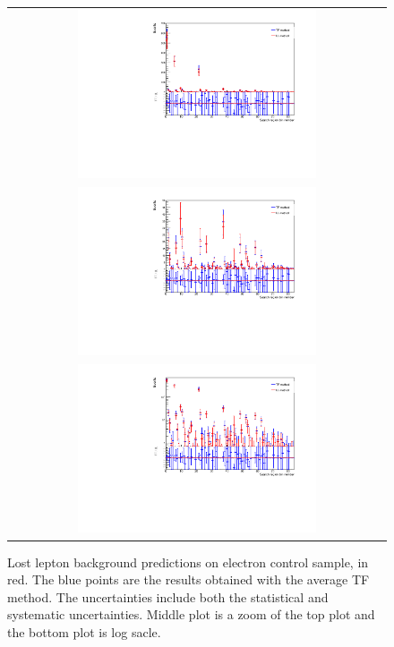 \begin{figure}[hptb]
\begin{center}
\begin{tabular}{c}
\includegraphics[width=0.65\textwidth]{sections/mc4/Backgrounds/LostLepton/figures/v4_DataCardCampare_0_700_el_cs.pdf}\\
\includegraphics[width=0.65\textwidth]{sections/mc4/Backgrounds/LostLepton/figures/v4_DataCardCampare_0_50_el_cs.pdf}\\
\includegraphics[width=0.65\textwidth]{sections/mc4/Backgrounds/LostLepton/figures/v4_DataCardCampare_0_700_el_cs_log.pdf}
\end{tabular}
\end{center}
\caption{Lost lepton background predictions on electron control sample, in red. The blue points are the results obtained with the average TF method.
The uncertainties include both the statistical and systematic uncertainties. Middle plot is a zoom of the top plot and the bottom plot is log sacle.}
\label{fig:LostLeptonResult_ele}
\end{figure}

